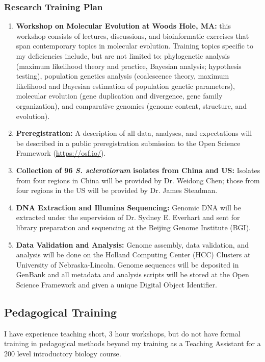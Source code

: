 \documentclass[12pt,letterpaper]{article}
\begin{document}
\subsubsection{Research Training Plan}

\begin{enumerate}
  \item \textbf{Workshop on Molecular Evolution at Woods Hole, MA:} this workshop consists of lectures, discussions, and bioinformatic exercises that span contemporary topics in molecular evolution. Training topics specific to my deficiencies include, but are not limited to: phylogenetic analysis (maximum likelihood theory and practice, Bayesian analysis; hypothesis testing), population genetics analysis (coalescence theory, maximum likelihood and Bayesian estimation of population genetic parameters), molecular evolution (gene duplication and divergence, gene family organization), and comparative genomics (genome content, structure, and evolution).
  \item \textbf{Preregistration:} A description of all data, analyses, and expectations will be described in a public preregistration submission to the Open Science Framework (\url{https://osf.io/}).
  \item \textbf{Collection of 96 \textit{S. sclerotiorum} isolates from China and US:} Isolates from four regions in China will be provided by Dr. Weidong Chen; those from four regions in the US will be provided by Dr. James Steadman. 
  \item \textbf{DNA Extraction and Illumina Sequencing:} Genomic DNA will be extracted under the supervision of Dr. Sydney E. Everhart and sent for library preparation and sequencing at the Beijing Genome Institute (BGI). 
  \item \textbf{Data Validation and Analysis:} Genome assembly, data validation,
  and analysis will be done on the Holland Computing Center (HCC) Clusters at University of Nebraska-Lincoln. Genome sequences will be deposited in GenBank and all metadata and analysis scripts will be stored at the Open Science Framework and given a unique Digital Object Identifier.
\end{enumerate}

\subsection{Pedagogical Training}

I have experience teaching short, 3 hour workshops, but do not have formal training in pedagogical methods beyond my training as a Teaching Assistant for a 200 level introductory biology course. 
\end{document}
